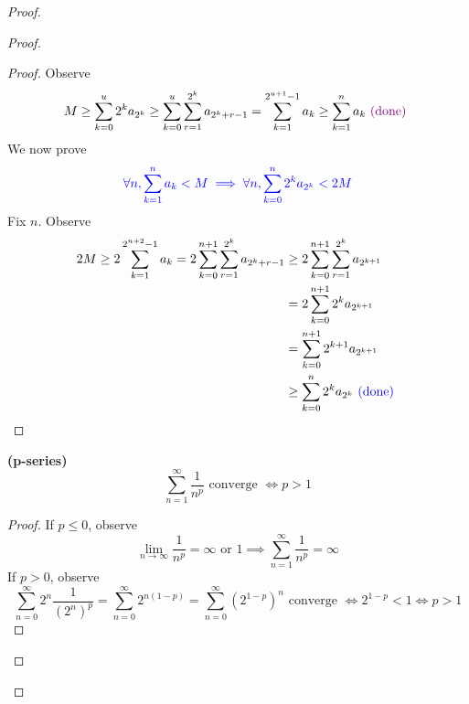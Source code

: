 \documentclass{report}
\begin{document}
\begin{proof}
\begin{proof}
\begin{proof}
Observe
\begin{equation}
M\geq \sum_{k=0}^u 2^k a_{2^k}\geq \sum_{k=0}^u \sum_{r=1}^{2^k} a_{2^{k}+r-1}=\sum_{k=1}^{2^{u+1}-1} a_k\geq \sum_{k=1}^n a_k\textcolor{violet}{\text{ (done) }}
\end{equation}
We now prove
\begin{equation}
  \textcolor{blue}{\forall n,\sum_{k=1}^n a_k<M\implies \forall n, \sum_{k=0}^n 2^ka_{2^k}<2M}
\end{equation}
Fix $n$. Observe
\begin{align}
  2M\geq 2\sum_{k=1}^{2^{n+2}-1} a_k=2\sum_{k=0}^{n+1}\sum_{r=1}^{2^k}a_{2^k+r-1}&\geq 2\sum_{k=0}^{n+1} \sum_{r=1}^{2^k}a_{2^{k+1}}\\
  &=2\sum_{k=0}^{n+1} 2^ka_{2^{k+1}}\\
  &=\sum_{k=0}^{n+1} 2^{k+1}a_{2^{k+1}}\\
  &\geq \sum_{k=0}^n 2^{k}a_{2^k}\textcolor{blue}{\text{ (done) }}
\end{align}
\end{proof}
\begin{corollary}
\label{4.2.12}
\textbf{(p-series)}
\begin{equation}
\sum_{n=1}^\infty \frac{1}{n^p}\text{ converge }\iff  p>1
\end{equation}
\end{corollary}
\begin{proof}
If $p\leq 0$, observe
\begin{equation}
\lim_{n\to\infty}\frac{1}{n^p}=\infty\text{ or }1\implies \sum_{n=1}^\infty \frac{1}{n^p}=\infty
\end{equation}
If $p>0$, observe
 \begin{equation}
\sum_{n=0}^\infty 2^n \frac{1}{(2^n)^p}=\sum_{n=0}^\infty 2^{n(1-p)}=\sum_{n=0}^\infty (2^{1-p})^n\text{ converge }\iff 2^{1-p}<1\iff p>1
\end{equation}
\end{proof}


\end{proof}
\end{proof}
\end{document}
